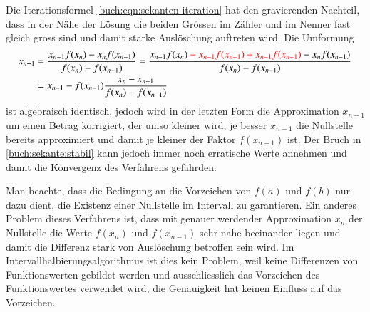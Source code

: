 Die Iterationsformel \eqref{buch:eqn:sekanten-iteration} hat den
gravierenden Nachteil, dass in der Nähe der Lösung die beiden
Grössen im Zähler und im Nenner fast gleich gross sind und damit
starke Auslöschung auftreten wird.
Die Umformung
\begin{align}
x_{n+1}
&=
\frac{x_{n-1}f(x_{n})-x_{n}f(x_{n-1})}{f(x_n)-f(x_{n-1})}
=
\frac{x_{n-1}f(x_{n})
{\color{red}\mathstrut -x_{n-1}f(x_{n-1})+x_{n-1}f(x_{n-1})}
-x_{n}f(x_{n-1})}{f(x_n)-f(x_{n-1})}
\\
&=x_{n-1} - f(x_{n-1})\frac{x_n-x_{n-1}}{f(x_n)-f(x_{n-1})}
\label{buch:sekante:stabil}
\end{align}
ist algebraisch identisch, jedoch wird in der letzten Form die Approximation
$x_{n-1}$ um einen Betrag korrigiert, der umso kleiner wird, je besser
$x_{n-1}$ die Nullstelle bereits approximiert und damit je kleiner
der Faktor $f(x_{n-1})$ ist.
Der Bruch in \eqref{buch:sekante:stabil} kann jedoch immer noch
erratische Werte annehmen und damit die Konvergenz des Verfahrens
gefährden.

Man beachte, dass die Bedingung an die Vorzeichen von $f(a)$ und $f(b)$
nur dazu dient, die Existenz einer Nullstelle im Intervall zu garantieren.
Ein anderes Problem dieses Verfahrens ist, dass mit genauer werdender
Approximation $x_n$ der Nullstelle die Werte $f(x_n)$ und $f(x_{n-1})$
sehr nahe beeinander liegen und damit die Differenz stark von 
Auslöschung betroffen sein wird.
Im Intervallhalbierungsalgorithmus ist dies kein Problem, weil keine
Differenzen von Funktionswerten gebildet werden und ausschliesslich das
Vorzeichen des Funktionswertes verwendet wird, die Genauigkeit hat
keinen Einfluss auf das Vorzeichen.



